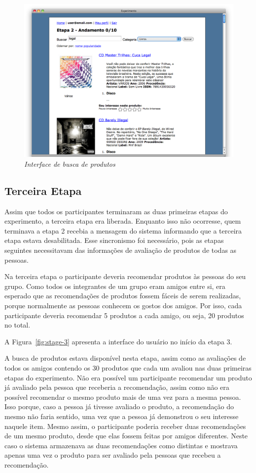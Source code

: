 \begin{figure}[htp]
  \centering
  \includegraphics[width=\textwidth]{imagens/search}
  \caption{\it Interface de busca de produtos}
  \label{fig:product-search}
\end{figure}

\subsection{Terceira Etapa}

Assim que todos os participantes terminaram as duas primeiras etapas do experimento, a terceira etapa era liberada. Enquanto isso não ocorresse, quem terminava a etapa 2 recebia a mensagem do sistema informando que a terceira etapa estava desabilitada. Esse sincronismo foi necessário, pois as etapas seguintes necessitavam das informações de avaliação de produtos de todas as pessoas.

Na terceira etapa o participante deveria recomendar produtos às pessoas do seu grupo. Como todos os integrantes de um grupo eram amigos entre si, era esperado que as recomendações de produtos fossem fáceis de serem realizadas, porque normalmente as pessoas conhecem os gostos dos amigos. Por isso, cada participante deveria recomendar 5 produtos a cada amigo, ou seja, 20 produtos no total.

A Figura~\ref{fig:stage-3} apresenta a interface do usuário no início da etapa 3.

A busca de produtos estava disponível nesta etapa, assim como as avaliações de todos os amigos contendo os 30 produtos que cada um avaliou nas duas primeiras etapas do experimento. Não era possível um participante recomendar um produto já avaliado pela pessoa que receberia a recomendação, assim como não era possível recomendar o mesmo produto mais de uma vez para a mesma pessoa. Isso porque, caso a pessoa já tivesse avaliado o produto, a recomendação do mesmo não faria sentido, uma vez que a pessoa já demonstrou o seu interesse naquele item. Mesmo assim, o participante poderia receber duas recomendações de um mesmo produto, desde que elas fossem feitas por amigos diferentes. Neste caso o sistema armazenava as duas recomendações como distintas e mostrava apenas uma vez o produto para ser avaliado pela pessoas que recebeu a recomendação.

